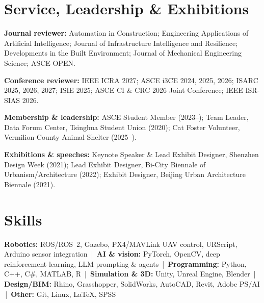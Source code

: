 \documentclass[10pt,a4paper]{article}
\begin{document}
\section{Service, Leadership \& Exhibitions}
\textbf{Journal reviewer:} Automation in Construction; Engineering Applications of Artificial Intelligence; Journal of Infrastructure Intelligence and Resilience; Developments in the Built Environment; Journal of Mechanical Engineering Science; ASCE OPEN.\par
\textbf{Conference reviewer:} IEEE ICRA 2027; ASCE i3CE 2024, 2025, 2026; ISARC 2025, 2026, 2027; ISIE 2025; ASCE CI \& CRC 2026 Joint Conference; IEEE ISR-SIAS 2026.\par
\textbf{Membership \& leadership:} ASCE Student Member (2023--); Team Leader, Data Forum Center, Tsinghua Student Union (2020); Cat Foster Volunteer, Vermilion County Animal Shelter (2025--).\par
\textbf{Exhibitions \& speeches:} Keynote Speaker \& Lead Exhibit Designer, Shenzhen Design Week (2021); Lead Exhibit Designer, Bi-City Biennale of Urbanism/Architecture (2022); Exhibit Designer, Beijing Urban Architecture Biennale (2021).\par

\section{Skills}
\textbf{Robotics:} ROS/ROS~2, Gazebo, PX4/MAVLink UAV control, URScript, Arduino sensor integration \,|\, \textbf{AI \& vision:} PyTorch, OpenCV, deep reinforcement learning, LLM prompting \& agents \,|\, \textbf{Programming:} Python, C++, C\#, MATLAB, R \,|\, \textbf{Simulation \& 3D:} Unity, Unreal Engine, Blender \,|\, \textbf{Design/BIM:} Rhino, Grasshopper, SolidWorks, AutoCAD, Revit, Adobe PS/AI \,|\, \textbf{Other:} Git, Linux, \LaTeX, SPSS\par
\end{document}
